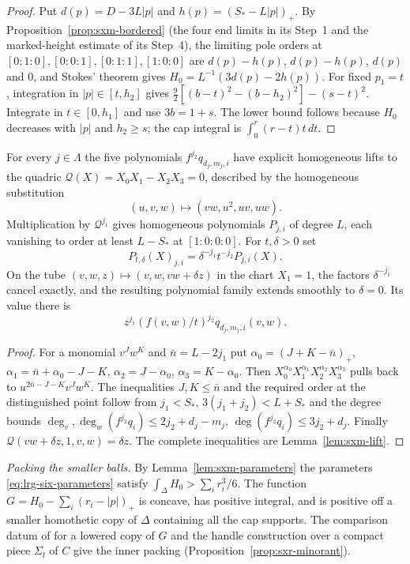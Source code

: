 \begin{proof}
Put $d(p)=D-3L|p|$ and $h(p)=(S_*-L|p|)_+$. By Proposition~\ref{prop:sxm-bordered} (the four end limits in its
Step~1 and the marked-height estimate of its Step~4), the limiting pole orders at $[0:1:0],[0:0:1],[0:1:1],[1:0:0]$ are
$d(p)-h(p)$, $d(p)-h(p)$, $d(p)$ and $0$, and Stokes' theorem gives $H_0=L^{-1}(3d(p)-2h(p))$.
For fixed $p_1=t$, integration in $|p|\in[t,h_2]$ gives
$\frac92[(b-t)^2-(b-h_2)^2]-(s-t)^2$.
Integrate in $t\in[0,h_1]$ and use $3b=1+s$.
The lower bound follows because $H_0$ decreases with $|p|$ and $h_2\ge s$;
the cap integral is $\int_0^r(r-t)t\,dt$.
\end{proof}

\begin{proposition}\label{prop:lrg-six-polynomials}
For every $j\in\Lambda$ the five polynomials
$f^{j_2}q_{d_j,m_j,i}$ have explicit homogeneous lifts to the quadric
$\mathcal Q(X)=X_0X_1-X_2X_3=0$, described by the homogeneous substitution
\[
 (u,v,w)\longmapsto(vw,u^2,uv,uw).
\]
Multiplication by $\mathcal Q^{j_1}$ gives homogeneous polynomials $P_{j,i}$ of degree $L$,
each vanishing to order at least $L-S_*$ at $[1:0:0:0]$.
For $t,\delta>0$ set
\[
 P_{t,\delta}(X)_{j,i}=\delta^{-j_1}t^{-j_2}P_{j,i}(X).
\]
On the tube $(v,w,z)\mapsto(v,w,vw+\delta z)$ in the chart $X_1=1$,
the factors $\delta^{-j_1}$ cancel exactly, and the resulting polynomial family extends
smoothly to $\delta=0$. Its value there is
\[
 z^{j_1}(f(v,w)/t)^{j_2}q_{d_j,m_j,i}(v,w).
\]
\end{proposition}

\begin{proof}
For a monomial $v^Jw^K$ and $\bar n=L-2j_1$ put
$\alpha_0=(J+K-\bar n)_+$, $\alpha_1=\bar n+\alpha_0-J-K$,
$\alpha_2=J-\alpha_0$, $\alpha_3=K-\alpha_0$.
Then $X_0^{\alpha_0}X_1^{\alpha_1}X_2^{\alpha_2}X_3^{\alpha_3}$ pulls back to
$u^{2\bar n-J-K}v^Jw^K$.
The inequalities $J,K\le\bar n$ and the required order at the distinguished point follow
from $j_1<S_*$, $3(j_1+j_2)<L+S_*$ and the degree bounds
$\deg_v,\deg_w(f^{j_2}q_i)\le2j_2+d_j-m_j$,
$\deg(f^{j_2}q_i)\le3j_2+d_j$.
Finally $\mathcal Q(vw+\delta z,1,v,w)=\delta z$.
The complete inequalities are Lemma~\ref{lem:sxm-lift}.
\end{proof}

\emph{Packing the smaller balls.} By Lemma~\ref{lem:sxm-parameters} the parameters \eqref{eq:lrg-six-parameters} satisfy
$\int_\Delta H_0>\sum_i r_i^3/6$. The function $G=H_0-\sum_i(r_i-|p|)_+$ is concave, has positive integral, and is
positive off a smaller homothetic copy of $\Delta$ containing all the cap supports. The comparison datum of
 for a lowered copy of $G$ and the handle construction over a compact piece $\Sigma_l$ of $C$
give the inner packing (Proposition~\ref{prop:sxr-minorant}).

